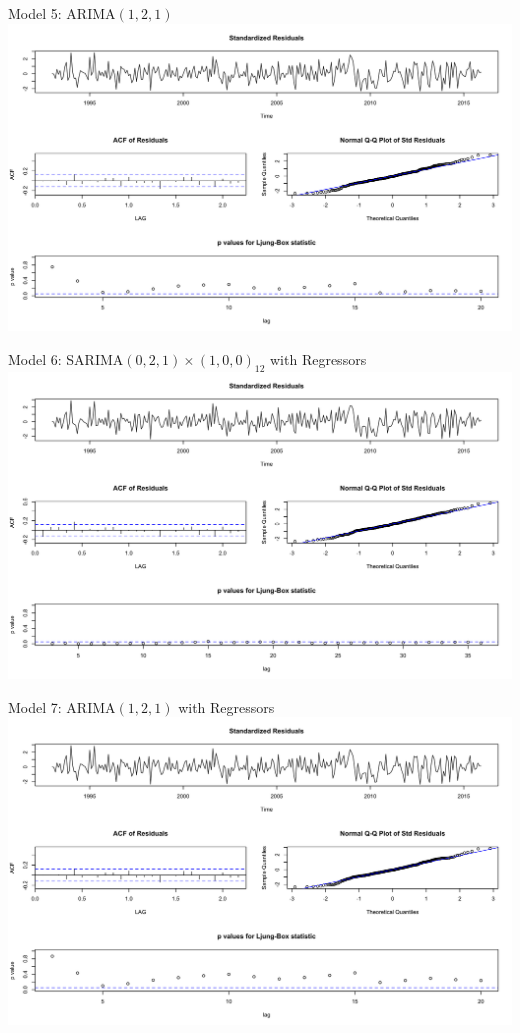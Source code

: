 \documentclass{beamer}
\begin{document}
  \begin{frame}{Model 5: ARIMA\((1,2,1)\)}
  		\includegraphics[width=\linewidth]{images/seasonallyadjustedmodel5}
  \end{frame}
  
  
  \begin{frame}{Model 6: SARIMA\((0,2,1) \times (1,0,0)_{12}\) with Regressors}
  		\includegraphics[width=\linewidth]{images/seasonallyadjustedmodel6}
  \end{frame}
  
  
  \begin{frame}{Model 7: ARIMA\((1,2,1)\) with Regressors}
  		\includegraphics[width=\linewidth]{images/seasonallyadjustedmodel7}
  \end{frame}  
  
  
\end{document}

